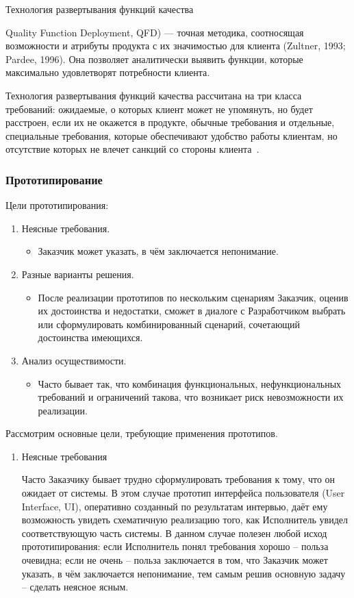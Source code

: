 \documentclass{../industrial-development}
\begin{document}
Технология развертывания функций качества {Quality Function Deployment, QFD) — точная методика, соотносящая возможности и атрибуты продукта с их значимостью для клиента (Zultner, 1993; Pardee, 1996). Она позволяет аналитически выявить функции, которые максимально удовлетворят потребности клиента.

Технология развертывания функций качества рассчитана на три класса требований: ожидаемые, о которых клиент может не упомянуть, но будет расстроен, если их не окажется в продукте, обычные требования и отдельные, специальные требования, которые обеспечивают удобство работы клиентам, но отсутствие которых не влечет санкций со стороны
клиента~\cite[с.~49--50]{Wiegers}.


\begin{frame} \frametitle {Прототипирование}
Цели прототипирования:
\begin{enumerate}
\item Неясные требования.
\begin{itemize}
\item Заказчик может указать, в чём заключается
непонимание.
\end{itemize}

\item Разные варианты решения.
\begin{itemize}
\item После реализации прототипов по нескольким сценариям Заказчик, оценив их достоинства и недостатки, сможет в диалоге с Разработчиком выбрать или сформулировать комбинированный сценарий, сочетающий достоинства имеющихся.
\end{itemize}
\item Анализ осуществимости.
\begin{itemize}
\item Часто бывает так, что комбинация функциональных, нефункциональных требований и ограничений такова, что возникает риск невозможности
их реализации.
\end{itemize}
\end{enumerate}

\end{frame}

\lecturenotes

Рассмотрим основные цели, требующие применения прототипов.
\begin{enumerate}
\item \alert{Неясные требования}

Часто Заказчику бывает трудно сформулировать
требования к тому, что он ожидает от системы. В этом случае прототип интерфейса
пользователя (User Interface, UI), оперативно созданный по результатам интервью, даёт
ему возможность увидеть схематичную реализацию того, как Исполнитель увидел
соответствующую часть системы. В данном случае полезен любой исход
прототипирования: если Исполнитель понял требования хорошо – польза очевидна; если
не очень – польза заключается в том, что Заказчик может указать, в чём заключается
непонимание, тем самым решив основную задачу – сделать неясное ясным.


\end{enumerate}}
\end{document}

